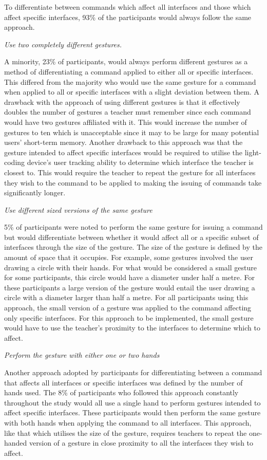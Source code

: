 \documentclass[link]{IWCOMP}
\begin{document}
To differentiate between commands which affect all interfaces and those which affect specific interfaces, 93\% of the participants would always follow the same approach.

\textit{Use two completely different gestures.}

A minority, 23\% of participants, would always perform different gestures as a method of differentiating a command applied to either all or specific interfaces.
This differed from the majority who would use the same gesture for a command when applied to all or specific interfaces with a slight deviation between them.
A drawback with the approach of using different gestures is that it effectively doubles the number of gestures a teacher must remember since each command would have two gestures affiliated with it.
This would increase the number of gestures to ten which is unacceptable since it may to be large for many potential users' short-term memory.
Another drawback to this approach was that the gesture intended to affect specific interfaces would be required to utilise the light-coding device's user tracking ability to determine which interface the teacher is closest to.
This would require the teacher to repeat the gesture for all interfaces they wish to the command to be applied to making the issuing of commands take significantly longer.

\textit{Use different sized versions of the same gesture}

5\% of participants were noted to perform the same gesture for issuing a command but would differentiate between whether it would affect all or a specific subset of interfaces through the size of the gesture.
The size of the gesture is defined by the amount of space that it occupies.
For example, some gestures involved the user drawing a circle with their hands.
For what would be considered a small gesture for some participants, this circle would have a diameter under half a metre.
For these participants a large version of the gesture would entail the user drawing a circle with a diameter larger than half a metre.
For all participants using this approach, the small version of a gesture was applied to the command affecting only specific interfaces.
For this approach to be implemented, the small gesture would have to use the teacher's proximity to the interfaces to determine which to affect.

\textit{Perform the gesture with either one or two hands}

Another approach adopted by participants for differentiating between a command that affects all interfaces or specific interfaces was defined by the number of hands used. 
The 8\% of participants who followed this approach constantly throughout the study would all use a single hand to perform gestures intended to affect specific interfaces.
These participants would then perform the same gesture with both hands when applying the command to all interfaces.
This approach, like that which utilises the size of the gesture, requires teachers to repeat the one-handed version of a gesture in close proximity to all the interfaces they wish to affect.
\end{document}

